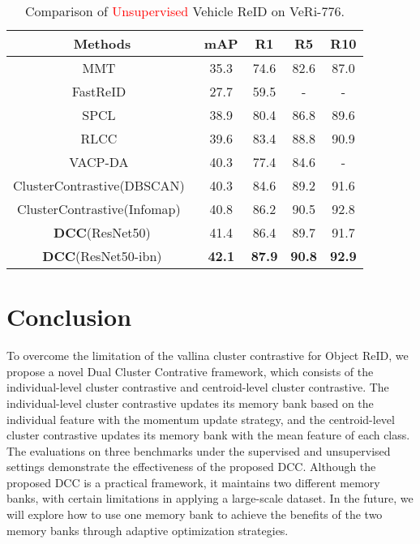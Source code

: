 \documentclass[10pt,twocolumn,letterpaper]{article}
\begin{document}
\begin{table}
\footnotesize
\begin{center}
\begin{tabular}{c|cccc}
\toprule
Methods           & mAP& R1 & R5 & R10\\
\midrule
MMT~\cite{ge2020mutual} & 35.3 & 74.6 & 82.6& 87.0 \\
FastReID~\cite{he2020fastreid} & 27.7& 59.5 & - &- \\
SPCL~\cite{DBLP:conf/nips/Ge0C0L20} & 38.9 & 80.4 & 86.8 & 89.6 \\
RLCC~\cite{DBLP:conf/cvpr/ZhangG0021} & 39.6 & 83.4 & 88.8 & 90.9 \\
VACP-DA~\cite{DBLP:journals/corr/abs-2011-09099} & 40.3 & 77.4 & 84.6 & - \\
ClusterContrastive(DBSCAN)~\cite{dai2021cluster} & 40.3 & 84.6 & 89.2 & 91.6 \\
ClusterContrastive(Infomap)~\cite{dai2021cluster} & 40.8 & 86.2 & 90.5 & 92.8 \\
\textbf{DCC}(ResNet50) &41.4&86.4&89.7&91.7\\
\textbf{DCC}(ResNet50-ibn) &\textbf{42.1}&\textbf{87.9}&\textbf{90.8}&\textbf{92.9}\\
\bottomrule
\end{tabular}
\caption{\small Comparison of \textcolor{red}{Unsupervised} Vehicle ReID on VeRi-776.}
\label{tab:unsupervised_veri}
\end{center}
\end{table}



\section{Conclusion}\label{sec:conclusion}
To overcome the limitation of the vallina cluster contrastive for Object ReID, we propose a novel Dual Cluster Contrative framework, which consists of the individual-level cluster contrastive and centroid-level cluster contrastive.
The individual-level cluster contrastive updates its memory bank based on the individual feature with the momentum update strategy, and the centroid-level cluster contrastive updates its memory bank with the mean feature of each class.
The evaluations on three benchmarks under the supervised and unsupervised settings demonstrate the effectiveness of the proposed DCC.
Although the proposed DCC is a practical framework, it maintains two different memory banks, with certain limitations in applying a large-scale dataset.
In the future, we will explore how to use one memory bank to achieve the benefits of the two memory banks through adaptive optimization strategies. 

 





{\small


}
\end{document}
